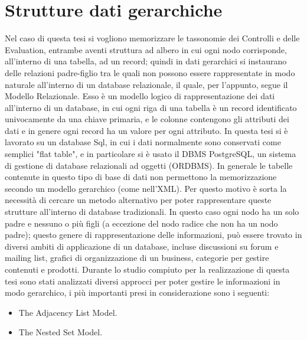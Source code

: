 \section{Strutture dati gerarchiche}
Nel caso di questa tesi si vogliono memorizzare le tassonomie dei Controlli e delle Evaluation, entrambe aventi struttura ad albero in cui ogni nodo corrisponde, all'interno di una tabella, ad un 
record; quindi in dati gerarchici si instaurano delle relazioni padre-figlio tra le quali non possono essere rappresentate in modo naturale 
all'interno di un database relazionale, il quale, per l'appunto, segue il Modello Relazionale.\hfill\break
Esso è un modello logico di rappresentazione dei dati all'interno di un database, in cui ogni riga di una tabella è un record identificato univocamente
da una chiave primaria, e le colonne contengono gli attributi dei dati e in genere ogni record ha un valore per ogni attributo.\hfill\break
In questa tesi si è lavorato su un database Sql, in cui i dati normalmente sono conservati come semplici "flat table", e in particolare si è usato il DBMS 
PostgreSQL, un sistema di gestione di database relazionali ad oggetti (ORDBMS). In generale le tabelle contenute in questo tipo di base di dati non permettono la 
memorizzazione secondo un modello gerarchico (come nell'XML).\hfill\break
Per questo motivo è sorta la necessità di cercare un metodo alternativo per poter rappresentare queste strutture all'interno di database tradizionali.
In questo caso ogni nodo ha un solo padre e nessuno o più figli (a eccezione del nodo radice che non ha un nodo padre); questo genere di rappresentazione 
delle informazioni, può essere trovato in diversi ambiti di applicazione di un database, incluse discussioni su forum e mailing list, 
grafici di organizzazione di un business, categorie per gestire contenuti e prodotti.\hfill\break
Durante lo studio compiuto per la realizzazione di questa tesi sono stati analizzati diversi approcci per poter gestire le informazioni in modo gerarchico, 
i più importanti presi in considerazione sono i seguenti: 
\begin{itemize}
    \item The Adjacency List Model.
    \item The Nested Set Model.
\end{itemize}
%
